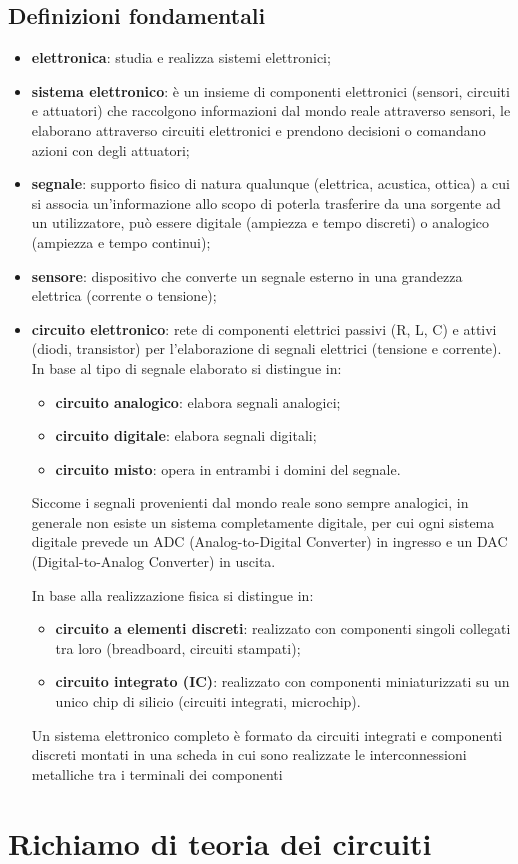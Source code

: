 \subsection{Definizioni fondamentali}
\begin{itemize}
	\item \textbf{elettronica}: studia e realizza sistemi elettronici;
	\item \textbf{sistema elettronico}: è un insieme di componenti elettronici (sensori, circuiti e attuatori) che raccolgono
	informazioni dal mondo reale attraverso sensori, le elaborano attraverso circuiti elettronici e prendono decisioni o
	comandano azioni con degli attuatori;
	\item \textbf{segnale}: supporto fisico di natura qualunque (elettrica, acustica, ottica) a cui si associa un'informazione
	allo scopo di poterla trasferire da una sorgente ad un utilizzatore, può essere digitale (ampiezza e tempo discreti) o
	analogico (ampiezza e tempo continui);
	\item \textbf{sensore}: dispositivo che converte un segnale esterno in una grandezza elettrica (corrente o tensione);
	\item \textbf{circuito elettronico}: rete di componenti elettrici passivi (R, L, C) e attivi (diodi, transistor) per
	l'elaborazione di segnali elettrici (tensione e corrente). In base al tipo di segnale elaborato si distingue in:
	\begin{itemize}[topsep=0pt]
		\item \textbf{circuito analogico}: elabora segnali analogici;
		\item \textbf{circuito digitale}: elabora segnali digitali;
		\item \textbf{circuito misto}: opera in entrambi i domini del segnale.
	\end{itemize}
	Siccome i segnali provenienti dal mondo reale sono sempre analogici, in generale non esiste un sistema completamente digitale,
	per cui ogni sistema digitale prevede un ADC (Analog-to-Digital Converter) in ingresso e un DAC (Digital-to-Analog Converter)
	in uscita.

	In base alla realizzazione fisica si distingue in:
	\begin{itemize}
		\item \textbf{circuito a elementi discreti}: realizzato con componenti singoli collegati tra loro (breadboard, circuiti
		stampati);
		\item \textbf{circuito integrato (IC)}: realizzato con componenti miniaturizzati su un unico chip di silicio (circuiti
		integrati, microchip).
	\end{itemize}
	Un sistema elettronico completo è formato da circuiti integrati e componenti discreti montati in una scheda in cui sono
	realizzate le interconnessioni metalliche tra i terminali dei componenti
\end{itemize}


\section{Richiamo di teoria dei circuiti}

